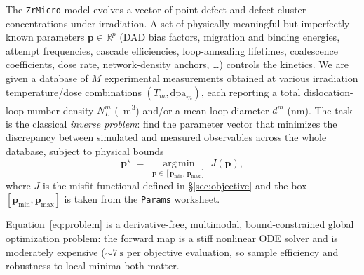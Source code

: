 \documentclass{article}
\newcommand{\R}{\mathbb{R}}
\newcommand{\param}{\bm{p}}
\newcommand{\dpa}{\mathrm{dpa}}
\newcommand{\NL}{N_{L}}
\begin{document}
The \texttt{ZrMicro} model evolves a vector of point-defect and defect-cluster
concentrations under irradiation. A set of physically meaningful but imperfectly
known parameters $\param\in\R^{p}$ (DAD bias factors, migration and binding energies,
attempt frequencies, cascade efficiencies, loop-annealing lifetimes, coalescence
coefficients, dose rate, network-density anchors, \dots) controls the kinetics. We are given
a database of $M$ experimental measurements obtained at various irradiation
temperature/dose combinations $(T_m,\dpa_m)$, each reporting a total dislocation-loop
number density $\NL^{m}$ (\si{\per\cubic\metre}) and/or a mean loop diameter
$d^{m}$ (\si{\nano\metre}). The task is the classical \emph{inverse problem}:
find the parameter vector that minimizes the discrepancy between simulated and
measured observables across the whole database, subject to physical bounds
\begin{equation}
  \param^{\star}
  \;=\;\operatorname*{arg\,min}_{\param\in[\param_{\min},\,\param_{\max}]}
  \; J(\param),
  \label{eq:problem}
\end{equation}
where $J$ is the misfit functional defined in \S\ref{sec:objective} and the box
$[\param_{\min},\param_{\max}]$ is taken from the \texttt{Params} worksheet.

Equation~\eqref{eq:problem} is a derivative-free, multimodal, bound-constrained
global optimization problem: the forward map is a stiff nonlinear ODE solver and is
moderately expensive (\(\sim\!\SI{7}{\second}\) per objective evaluation, so sample efficiency and robustness to local minima both matter.

\end{document}
